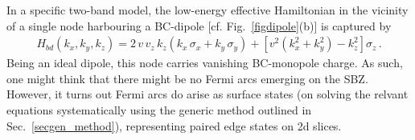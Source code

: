 \documentclass[aps,prb,onecolumn, footinbib, 10pt]{revtex4-2}
\begin{document}
In a specific two-band model, the low-energy effective Hamiltonian in the vicinity of a single node harbouring a BC-dipole [cf. Fig.~\ref{figdipole}(b)] is captured by \cite{twoband-dipole}
\begin{align}
\label{eqbcd1}
H_{bd} (k_x, k_y, k_z)= 2\, v\, v_z \, k_z \left( k_x \, \sigma_x  +  k_y \,\sigma_y  \right )
+  \left [ v^2 \left( k_x^2 +k_y^2 \right) - k_z^2 \right ] \sigma_z \,.
\end{align}
Being an ideal dipole, this node carries vanishing BC-monopole charge. As such, one might think that there might be no Fermi arcs emerging on the SBZ. However, it turns out Fermi arcs do arise as surface states (on solving the relvant equations systematically using the generic method outlined in Sec.~\ref{secgen_method}), representing paired edge states on 2d slices. 
\end{document}
